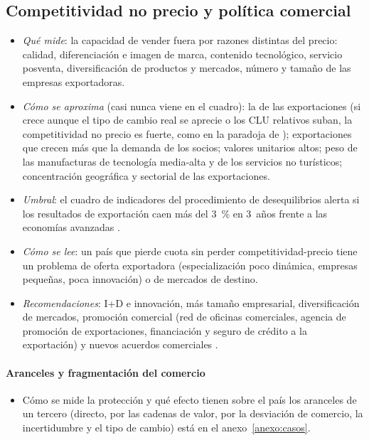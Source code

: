 \documentclass[11pt]{article}
\begin{document}
\subsection{Competitividad no precio y política comercial}\label{sec:no-precio}

\begin{itemize}
\item \emph{Qué mide}: la capacidad de vender fuera por razones distintas del precio: calidad, diferenciación e imagen de marca, contenido tecnológico, servicio posventa, diversificación de productos y mercados, número y tamaño de las empresas exportadoras.
\item \emph{Cómo se aproxima} (casi nunca viene en el cuadro): la  de las exportaciones (si crece aunque el tipo de cambio real se aprecie o los CLU relativos suban, la competitividad no precio es fuerte, como en la paradoja de ); exportaciones que crecen más que la demanda de los socios; valores unitarios altos; peso de las manufacturas de tecnología media-alta y de los servicios no turísticos; concentración geográfica y sectorial de las exportaciones.
\item \emph{Umbral}: el cuadro de indicadores del procedimiento de desequilibrios alerta si los resultados de exportación caen más del 3~\% en 3~años frente a las economías avanzadas \parencite{CE2025AMR2026}.
\item \emph{Cómo se lee}: un país que pierde cuota sin perder competitividad-precio tiene un problema de oferta exportadora (especialización poco dinámica, empresas pequeñas, poca innovación) o de mercados de destino.
\item \emph{Recomendaciones}: I+D e innovación, más tamaño empresarial, diversificación de mercados, promoción comercial (red de oficinas comerciales, agencia de promoción de exportaciones, financiación y seguro de crédito a la exportación) y nuevos acuerdos comerciales  .
\end{itemize}

\paragraph{Aranceles y fragmentación del comercio}
\begin{itemize}
\item Cómo se mide la protección y qué efecto tienen sobre el país los aranceles de un tercero (directo, por las cadenas de valor, por la desviación de comercio, la incertidumbre y el tipo de cambio) está en el anexo~\ref{anexo:casos}.
\end{itemize}
\end{document}
